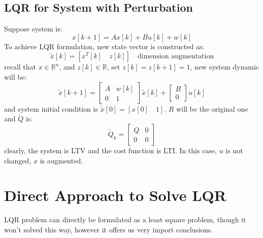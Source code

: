 \documentclass[10pt,a4paper,oneside]{article}
\begin{document}
\subsection{LQR for System with Perturbation}
Suppose system is:
\[
x[k+1] = Ax[k] + Bu[k] + w[k]
\]
To achieve LQR formulation, new state vector is constructed as:
\[
\tilde{x}[k] = [x^T[k] \quad z[k]] \quad \text{dimension augmentation}
\]
recall that $x \in \mathbb{R}^n$, and $z[k] \in \mathbb{R}$, set $z[k] = z[k+1] =1$, new system dynamic will be:
\[
\tilde{x}[k+1] = \begin{bmatrix}
A & w[k] \\ 0& 1
\end{bmatrix} \tilde{x}[k] + \begin{bmatrix}
B \\ 0
\end{bmatrix} u[k]
\]
and system initial condition is $\tilde{x}[0] = [x[0] \quad 1]$. $R$ will be the original one and $\tilde{Q}$ is:
\[
\tilde{Q}_k = \begin{bmatrix}
Q & 0\\
0 & 0
\end{bmatrix}
\]
clearly, the system is LTV and the cost function is LTI. In this case, $u$ is not changed, $x$ is augmented.

\section{Direct Approach to Solve LQR}
LQR problem can directly be formulated as a least square problem, though it won't solved this way, however it offers us very import conclusions.
\end{document}
